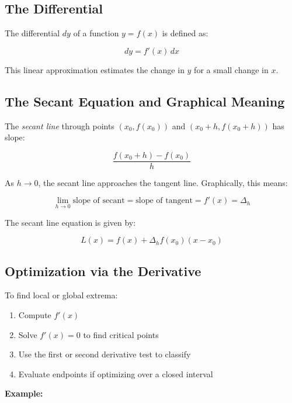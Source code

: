 \subsection{The Differential}

The differential \(dy\) of a function \(y = f(x)\) is defined as:

\[
    dy = f'(x) \, dx
\]

This linear approximation estimates the change in \(y\) for a small change in \(x\).

\subsection{The Secant Equation and Graphical Meaning}

The \emph{secant line} through points \((x_0, f(x_0))\) and \((x_0 + h, f(x_0 + h))\) has slope:

\[
    \frac{f(x_0 + h) - f(x_0)}{h}
\]

As \(h \to 0\), the secant line approaches the tangent line. Graphically, this means:

\[
    \lim_{h \to 0} \text{slope of secant} = \text{slope of tangent} = f'(x) = \Delta_h
\]

The secant line equation is given by:

\[
    L(x) = f(x) + \Delta_h f(x_0)(x - x_0)
\]

\subsection{Optimization via the Derivative}

To find local or global extrema:

\begin{enumerate}

    \item Compute \(f'(x)\)

    \item Solve \(f'(x) = 0\) to find critical points

    \item Use the first or second derivative test to classify

    \item Evaluate endpoints if optimizing over a closed interval

\end{enumerate}

\textbf{Example:}
\vspace{\baselineskip}

